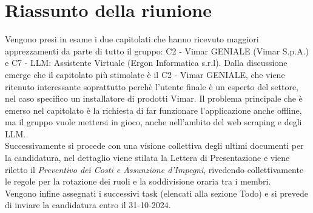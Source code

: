 \section{Riassunto della riunione}
    Vengono presi in esame i due capitolati che hanno ricevuto maggiori apprezzamenti da parte di tutto il gruppo: C2 - Vimar GENIALE (Vimar S.p.A.) e C7 - LLM: Assistente Virtuale (Ergon Informatica s.r.l). Dalla discussione emerge che il capitolato più stimolate è il C2 - Vimar GENIALE, che viene ritenuto interessante soprattutto perchè l'utente finale è un esperto del settore, nel caso specifico un installatore di prodotti Vimar.
    Il problema principale che è emerso nel capitolato è la richiesta di far funzionare l'applicazione anche offline, ma il gruppo vuole mettersi in gioco, anche nell'ambito del web scraping e degli LLM.
\bigskip
    \\Successivamente si procede con una visione collettiva degli ultimi documenti per la candidatura, nel dettaglio viene stilata la Lettera di Presentazione e viene riletto il \textit{Preventivo dei Costi e Assunzione d'Impegni}, rivedendo collettivamente le regole per la rotazione dei ruoli e la soddivisione oraria tra i membri.
    \bigskip 
    \bigskip
    \\Vengono infine assegnati i successivi task (elencati alla sezione Todo) e si prevede di inviare la candidatura entro il 31-10-2024.

